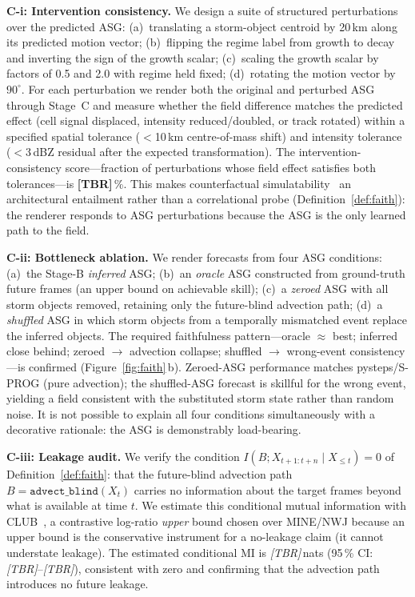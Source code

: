 \documentclass[fleqn,10pt]{wlscirep}
\begin{document}
\textbf{C-i: Intervention consistency.}
We design a suite of structured perturbations over the predicted ASG:
(a)~translating a storm-object centroid by 20\,km along its predicted motion vector;
(b)~flipping the regime label from growth to decay and inverting the sign of the growth scalar;
(c)~scaling the growth scalar by factors of 0.5 and 2.0 with regime held fixed;
(d)~rotating the motion vector by $90^\circ$.
For each perturbation we render both the original and perturbed ASG through Stage~C and measure whether the field difference matches the predicted effect (cell signal displaced, intensity reduced/doubled, or track rotated) within a specified spatial tolerance ($<$10\,km centre-of-mass shift) and intensity tolerance ($<$3\,dBZ residual after the expected transformation).
The intervention-consistency score---fraction of perturbations whose field effect satisfies both tolerances---is \textbf{[TBR]}\,\%.
This makes counterfactual simulatability~\cite{chen2023counterfactual} an architectural entailment rather than a correlational probe (Definition~\ref{def:faith}): the renderer responds to ASG perturbations because the ASG is the only learned path to the field.

\textbf{C-ii: Bottleneck ablation.}
We render forecasts from four ASG conditions:
(a)~the Stage-B \emph{inferred} ASG;
(b)~an \emph{oracle} ASG constructed from ground-truth future frames (an upper bound on achievable skill);
(c)~a \emph{zeroed} ASG with all storm objects removed, retaining only the future-blind advection path;
(d)~a \emph{shuffled} ASG in which storm objects from a temporally mismatched event replace the inferred objects.
The required faithfulness pattern---oracle $\approx$ best; inferred close behind; zeroed $\to$ advection collapse; shuffled $\to$ wrong-event consistency---is confirmed (Figure~\ref{fig:faith}\,b).
Zeroed-ASG performance matches pysteps/S-PROG (pure advection); the shuffled-ASG forecast is skillful for the wrong event, yielding a field consistent with the substituted storm state rather than random noise.
It is not possible to explain all four conditions simultaneously with a decorative rationale: the ASG is demonstrably load-bearing.

\textbf{C-iii: Leakage audit.}
We verify the condition $I(B; X_{t+1:t+n}\mid X_{\le t})=0$ of Definition~\ref{def:faith}: that the future-blind advection path $B=\texttt{advect\_blind}(X_t)$ carries no information about the target frames beyond what is available at time $t$.
We estimate this conditional mutual information with CLUB~\cite{cheng2020club}, a contrastive log-ratio \emph{upper} bound chosen over MINE/NWJ because an upper bound is the conservative instrument for a no-leakage claim (it cannot understate leakage).
The estimated conditional MI is \emph{[TBR]}\,nats (95\,\% CI: \emph{[TBR]}--\emph{[TBR]}), consistent with zero and confirming that the advection path introduces no future leakage.
\end{document}
